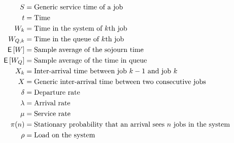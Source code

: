 \begin{align*}
  S &= \text{Generic service time of a job} \\
  t &= \text{Time} \\
  W_k &= \text{Time in the system of $k$th job} \\
  W_{Q,k} &= \text{Time in the queue of $k$th job} \\
  \,\mathsf{E}\left[W\right] &= \text{Sample average of the sojourn time} \\
  \,\mathsf{E}\left[W_Q\right] &= \text{Sample average of the time in queue} \\
  X_k &= \text{Inter-arrival time between job $k-1$ and job  $k$} \\
  X &= \text{Generic inter-arrival time between two consecutive jobs} \\
  \delta &= \text{Departure rate} \\
  \lambda &= \text{Arrival rate} \\
  \mu &= \text{Service rate} \\
  \pi(n)  &= \text{Stationary probability that an arrival sees $n$ jobs in the system} \\
  \rho &= \text{Load on the system} \\
\end{align*}
